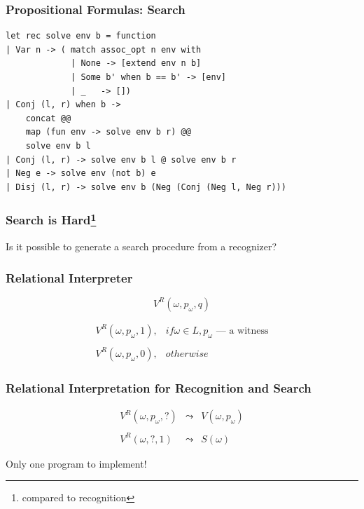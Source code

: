 \documentclass[xcolor=table]{beamer}
\begin{document}
\begin{frame}[fragile]
  \transwipe[direction=90]
  \frametitle{Propositional Formulas: Search}

\begin{lstlisting}
let rec solve env b = function
| Var n -> ( match assoc_opt n env with
             | None -> [extend env n b]
             | Some b' when b == b' -> [env]
             | _   -> [])
| Conj (l, r) when b ->
    concat @@
    map (fun env -> solve env b r) @@
    solve env b l
| Conj (l, r) -> solve env b l @ solve env b r
| Neg e -> solve env (not b) e
| Disj (l, r) -> solve env b (Neg (Conj (Neg l, Neg r)))
\end{lstlisting}
\end{frame}

\begin{frame}[fragile]
  \transwipe[direction=90]
  \frametitle{Search is Hard\footnote{compared to recognition}}
\begin{center}
Is it possible to generate a search procedure from a recognizer?
\end{center}
\end{frame}


\begin{frame}[fragile]
  \transwipe[direction=90]
  \frametitle{Relational Interpreter}
\[ V^R(\omega, p_{\omega}, q) \]

\[
\begin{array}{ll}
  V^R(\omega, p_{\omega}, 1), & if \omega \in L, p_{\omega} \text{ --- a witness} \\
  & \\
  V^R(\omega, p_{\omega}, 0), & otherwise
\end{array}
\]
\end{frame}


\begin{frame}[fragile]
  \transwipe[direction=90]
  \frametitle{Relational Interpretation for Recognition and Search}

\[
\begin{array}{rcl}
 V^R(\omega, p_{\omega}, ?) & \leadsto & V(\omega, p_{\omega}) \\
 & \\
 V^R(\omega, ?, 1) & \leadsto & S(\omega)
\end{array}
\]

\vspace*{\fill}

\begin{center} Only one program to implement! \end{center}
\end{frame}
\end{document}
